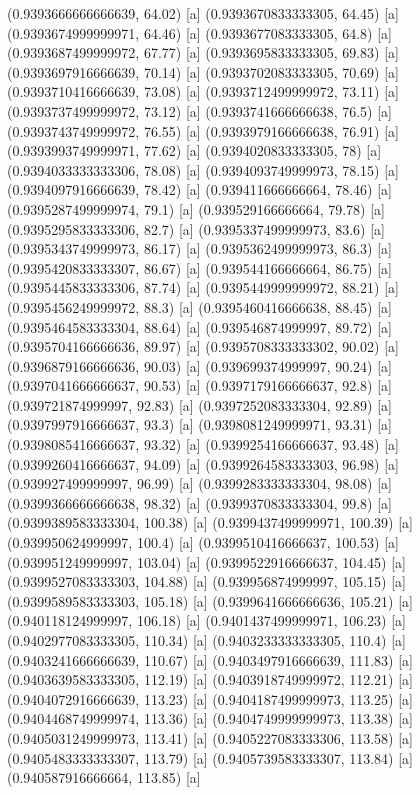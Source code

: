 {{{(0.9393666666666639, 64.02) [a] 
(0.9393670833333305, 64.45) [a] 
(0.9393674999999971, 64.46) [a] 
(0.9393677083333305, 64.8) [a] 
(0.9393687499999972, 67.77) [a] 
(0.9393695833333305, 69.83) [a] 
(0.9393697916666639, 70.14) [a] 
(0.9393702083333305, 70.69) [a] 
(0.9393710416666639, 73.08) [a] 
(0.9393712499999972, 73.11) [a] 
(0.9393737499999972, 73.12) [a] 
(0.9393741666666638, 76.5) [a] 
(0.9393743749999972, 76.55) [a] 
(0.9393979166666638, 76.91) [a] 
(0.9393993749999971, 77.62) [a] 
(0.9394020833333305, 78) [a] 
(0.9394033333333306, 78.08) [a] 
(0.9394093749999973, 78.15) [a] 
(0.9394097916666639, 78.42) [a] 
(0.939411666666664, 78.46) [a] 
(0.9395287499999974, 79.1) [a] 
(0.939529166666664, 79.78) [a] 
(0.9395295833333306, 82.7) [a] 
(0.9395337499999973, 83.6) [a] 
(0.9395343749999973, 86.17) [a] 
(0.9395362499999973, 86.3) [a] 
(0.9395420833333307, 86.67) [a] 
(0.939544166666664, 86.75) [a] 
(0.9395445833333306, 87.74) [a] 
(0.9395449999999972, 88.21) [a] 
(0.9395456249999972, 88.3) [a] 
(0.9395460416666638, 88.45) [a] 
(0.9395464583333304, 88.64) [a] 
(0.939546874999997, 89.72) [a] 
(0.9395704166666636, 89.97) [a] 
(0.9395708333333302, 90.02) [a] 
(0.9396879166666636, 90.03) [a] 
(0.939699374999997, 90.24) [a] 
(0.9397041666666637, 90.53) [a] 
(0.9397179166666637, 92.8) [a] 
(0.939721874999997, 92.83) [a] 
(0.9397252083333304, 92.89) [a] 
(0.9397997916666637, 93.3) [a] 
(0.9398081249999971, 93.31) [a] 
(0.9398085416666637, 93.32) [a] 
(0.9399254166666637, 93.48) [a] 
(0.9399260416666637, 94.09) [a] 
(0.9399264583333303, 96.98) [a] 
(0.939927499999997, 96.99) [a] 
(0.9399283333333304, 98.08) [a] 
(0.9399366666666638, 98.32) [a] 
(0.9399370833333304, 99.8) [a] 
(0.9399389583333304, 100.38) [a] 
(0.9399437499999971, 100.39) [a] 
(0.939950624999997, 100.4) [a] 
(0.9399510416666637, 100.53) [a] 
(0.939951249999997, 103.04) [a] 
(0.9399522916666637, 104.45) [a] 
(0.9399527083333303, 104.88) [a] 
(0.939956874999997, 105.15) [a] 
(0.9399589583333303, 105.18) [a] 
(0.9399641666666636, 105.21) [a] 
(0.940118124999997, 106.18) [a] 
(0.9401437499999971, 106.23) [a] 
(0.9402977083333305, 110.34) [a] 
(0.9403233333333305, 110.4) [a] 
(0.9403241666666639, 110.67) [a] 
(0.9403497916666639, 111.83) [a] 
(0.9403639583333305, 112.19) [a] 
(0.9403918749999972, 112.21) [a] 
(0.9404072916666639, 113.23) [a] 
(0.9404187499999973, 113.25) [a] 
(0.9404468749999974, 113.36) [a] 
(0.9404749999999973, 113.38) [a] 
(0.9405031249999973, 113.41) [a] 
(0.9405227083333306, 113.58) [a] 
(0.9405483333333307, 113.79) [a] 
(0.9405739583333307, 113.84) [a] 
(0.940587916666664, 113.85) [a] 
}}}
